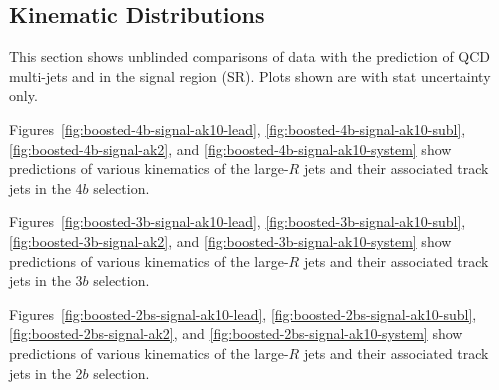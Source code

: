 \clearpage
\subsection{Kinematic Distributions}

This section shows unblinded comparisons of data with the prediction of QCD multi-jets and \ttbar in the signal region (SR). Plots shown are with stat uncertainty only.

Figures~\ref{fig:boosted-4b-signal-ak10-lead}, \ref{fig:boosted-4b-signal-ak10-subl}, \ref{fig:boosted-4b-signal-ak2}, and \ref{fig:boosted-4b-signal-ak10-system} show predictions of various kinematics of the large-$R$ jets and their associated track jets in the 4$b$ selection.

Figures~\ref{fig:boosted-3b-signal-ak10-lead}, \ref{fig:boosted-3b-signal-ak10-subl}, \ref{fig:boosted-3b-signal-ak2}, and \ref{fig:boosted-3b-signal-ak10-system} show predictions of various kinematics of the large-$R$ jets and their associated track jets in the 3$b$ selection.

Figures~\ref{fig:boosted-2bs-signal-ak10-lead}, \ref{fig:boosted-2bs-signal-ak10-subl}, \ref{fig:boosted-2bs-signal-ak2}, and \ref{fig:boosted-2bs-signal-ak10-system} show predictions of various kinematics of the large-$R$ jets and their associated track jets in the 2$b$ selection.

